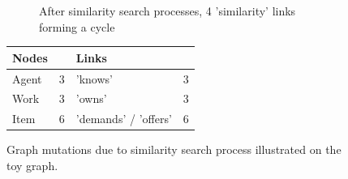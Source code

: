 \documentclass{article}
\begin{document}
\begin{figure}[H]
\begin{subfigure}{0.45\textwidth}
        \caption{After similarity search processes, 4 'similarity' links forming a cycle}
        \label{fig:small-after-processes}
    \end{subfigure}
    \scriptsize
    \begin{tabular}{ | L{2 cm}  L{0.5 cm} | L{3 cm}  L{0.5 cm} | }
    \hline
    \textbf{Nodes} &  & \textbf{Links} &   \\ \hline
    Agent & 3 & 'knows' & 3  \\ \hline
    Work & 3 & 'owns' & 3 \\ \hline
    Item & 6 & 'demands' / 'offers' & 6 \\ \hline
    \end{tabular}
    \caption{Graph mutations due to similarity search process illustrated on the toy graph.}
    \label{fig:graph-mutations-small-similarity-search}
\end{figure}
\end{document}
